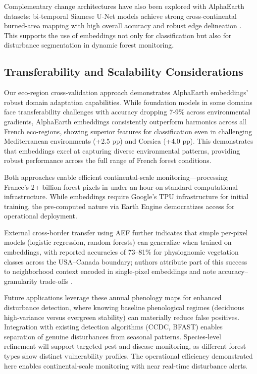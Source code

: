\documentclass[utf8]{FrontiersinHarvard}
\begin{document}
Complementary change architectures have also been explored with AlphaEarth datasets: bi-temporal Siamese U-Net models achieve strong cross-continental burned-area mapping with high overall accuracy and robust edge delineation \citep{Seydi2025AlphaEarthBurnedArea}. This supports the use of embeddings not only for classification but also for disturbance segmentation in dynamic forest monitoring.

\subsection{Transferability and Scalability Considerations}

Our eco-region cross-validation approach demonstrates AlphaEarth embeddings' robust domain adaptation capabilities. While foundation models in some domains face transferability challenges with accuracy dropping 7-9\% across environmental gradients, AlphaEarth embeddings consistently outperform harmonics across all French eco-regions, showing superior features for classification even in challenging Mediterranean environments (+2.5 pp) and Corsica (+4.0 pp). This demonstrates that embeddings excel at capturing diverse environmental patterns, providing robust performance across the full range of French forest conditions.

Both approaches enable efficient continental-scale monitoring—processing France's 2+ billion forest pixels in under an hour on standard computational infrastructure. While embeddings require Google's TPU infrastructure for initial training, the pre-computed nature via Earth Engine democratizes access for operational deployment.

External cross-border transfer using AEF further indicates that simple per-pixel models (logistic regression, random forests) can generalize when trained on embeddings, with reported accuracies of \~73–81\% for physiognomic vegetation classes across the USA–Canada boundary; authors attribute part of this success to neighborhood context encoded in single-pixel embeddings and note accuracy–granularity trade-offs \citep{Houriez2025AEFDataGen}.

Future applications leverage these annual phenology maps for enhanced disturbance detection, where knowing baseline phenological regimes (deciduous high-variance versus evergreen stability) can materially reduce false positives. Integration with existing detection algorithms (CCDC, BFAST) enables separation of genuine disturbances from seasonal patterns. Species-level refinement will support targeted pest and disease monitoring, as different forest types show distinct vulnerability profiles. The operational efficiency demonstrated here enables continental-scale monitoring with near real-time disturbance alerts.
\end{document}
